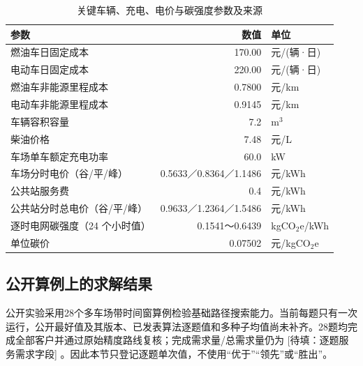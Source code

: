 \documentclass{setp-new}
\DeclareRobustCommand{\TBD}[1]{%
  \begingroup\setlength{\fboxsep}{1.2pt}%
  \colorbox{black!12}{\textcolor{black!65}{\textsf{\footnotesize[待填：#1]}}}%
  \endgroup}
\begin{document}
\begin{table}[htbp]
  \centering
  \caption{关键车辆、充电、电价与碳强度参数及来源}
  \label{tab:parameters}
  \scriptsize
  \begin{tabular}{lrl}
    \toprule
    参数 & 数值 & 单位\\
    \midrule
    燃油车日固定成本 & 170.00 & 元/(辆·日)\\
    电动车日固定成本 & 220.00 & 元/(辆·日)\\
    燃油车非能源里程成本 & 0.7800 & 元/km\\
    电动车非能源里程成本 & 0.9145 & 元/km\\
    车辆容积容量 & 7.2 & m$^3$\\
    柴油价格 & 7.48 & 元/L\\
    车场单车额定充电功率 & 60.0 & kW\\
    车场分时电价（谷/平/峰） & 0.5633／0.8364／1.1486 & 元/kWh\\
    公共站服务费 & 0.4 & 元/kWh\\
    公共站分时总电价（谷/平/峰） & 0.9633／1.2364／1.5486 & 元/kWh\\
    逐时电网碳强度（24 个小时值） & 0.1541～0.6439 & kgCO$_2$e/kWh\\
    单位碳价 & 0.07502 & 元/kgCO$_2$e\\
    \bottomrule
  \end{tabular}
\end{table}

\subsection{公开算例上的求解结果}

公开实验采用28个多车场带时间窗算例检验基础路径搜索能力。当前每题只有一次运行，公开最好值及其版本、已发表算法逐题值和多种子均值尚未补齐。28题均完成全部客户并通过原始精度路线复核；完成需求量/总需求量仍为\TBD{逐题服务需求字段}。因此本节只登记逐题单次值，不使用“优于”“领先”或“胜出”。
\end{document}
